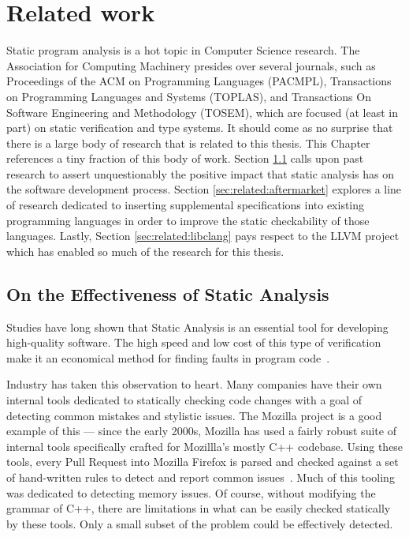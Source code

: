 \chapter{Related work}\label{sec:related}

Static program analysis is a hot topic in Computer Science research.  The Association for Computing Machinery presides over several journals, such as Proceedings of the ACM on Programming Languages (PACMPL), Transactions on Programming Languages and Systems (TOPLAS), and Transactions On Software Engineering and Methodology (TOSEM), which are focused (at least in part) on static verification and type systems.  It should come as no surprise that there is a large body of research that is related to this thesis.  This Chapter references a tiny fraction of this body of work.  Section \ref{sec:related:effectiveness} calls upon past research to assert unquestionably the positive impact that static analysis has on the software development process.  Section \ref{sec:related:aftermarket} explores a line of research dedicated to inserting supplemental specifications into existing programming languages in order to improve the static checkability of those languages.  Lastly, Section \ref{sec:related:libclang} pays respect to the LLVM project which has enabled so much of the research for this thesis.

\section{On the Effectiveness of Static Analysis}\label{sec:related:effectiveness}

Studies have long shown that Static Analysis is an essential tool for developing high-quality software.  The high speed and low cost of this type of verification make it an economical method for finding faults in program code~\cite{staticanal, static-anal-experience}.  

Industry has taken this observation to heart.  Many companies have their own internal tools dedicated to statically checking code changes with a goal of detecting common mistakes and stylistic issues.  The Mozilla project is a good example of this --- since the early 2000s, Mozilla has used a fairly robust suite of internal tools specifically crafted for Mozillla's mostly C++ codebase.  Using these tools, every Pull Request into Mozilla Firefox is parsed and checked against a set of hand-written rules to detect and report common issues~\cite{mozilla-pork-blog, moz-wiki-static-anal}.  Much of this tooling was dedicated to detecting memory issues.  Of course, without modifying the grammar of C++, there are limitations in what can be easily checked statically by these tools.  Only a small subset of the problem could be effectively detected.  

